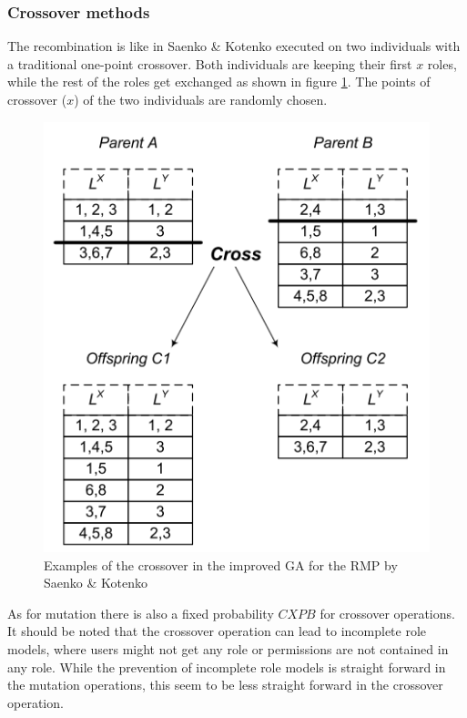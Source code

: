         \subsubsection{Crossover methods}
        The recombination is like in Saenko \& Kotenko\cite{saenko2012design} executed on two individuals with a traditional one-point crossover. Both individuals are keeping their first $x$ roles, while the rest of the roles get exchanged as shown in figure \ref{fig:crossover}. The points of crossover ($x$) of the two individuals are randomly chosen.
        \begin{figure}
            \centering
            \includegraphics[scale=0.8]{./Figures/crossover.png}
            \caption{Examples of the crossover in the improved GA for the RMP by Saenko \& Kotenko\cite{saenko2012design}}
            \label{fig:crossover}
        \end{figure}
        As for mutation there is also a fixed probability $CXPB$ for crossover operations. It should be noted that the crossover operation can lead to incomplete role models, where users might not get any role or permissions are not contained in any role. While the prevention of incomplete role models is straight forward in the mutation operations, this seem to be less straight forward in the crossover operation.
